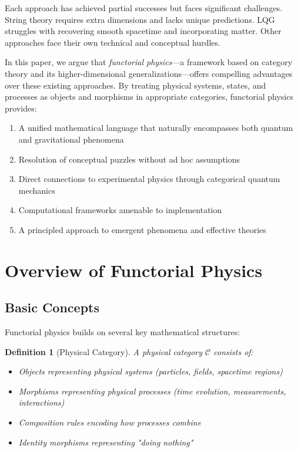 \documentclass[11pt,a4paper]{article}
\newtheorem{definition}[theorem]{Definition}
\begin{document}
Each approach has achieved partial successes but faces significant challenges. String theory requires extra dimensions and lacks unique predictions. LQG struggles with recovering smooth spacetime and incorporating matter. Other approaches face their own technical and conceptual hurdles.

In this paper, we argue that \emph{functorial physics}---a framework based on category theory and its higher-dimensional generalizations---offers compelling advantages over these existing approaches. By treating physical systems, states, and processes as objects and morphisms in appropriate categories, functorial physics provides:

\begin{enumerate}
    \item A unified mathematical language that naturally encompasses both quantum and gravitational phenomena
    \item Resolution of conceptual puzzles without ad hoc assumptions
    \item Direct connections to experimental physics through categorical quantum mechanics
    \item Computational frameworks amenable to implementation
    \item A principled approach to emergent phenomena and effective theories
\end{enumerate}

\section{Overview of Functorial Physics}

\subsection{Basic Concepts}

Functorial physics builds on several key mathematical structures:

\begin{definition}[Physical Category]
A \emph{physical category} $\mathcal{C}$ consists of:
\begin{itemize}
    \item Objects representing physical systems (particles, fields, spacetime regions)
    \item Morphisms representing physical processes (time evolution, measurements, interactions)
    \item Composition rules encoding how processes combine
    \item Identity morphisms representing "doing nothing"
\end{itemize}
\end{definition}
\end{document}
